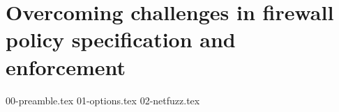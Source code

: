 \chapter{Overcoming challenges in firewall policy specification and enforcement}
\label{extend:chapter}

{00-preamble.tex}
{01-options.tex}
{02-netfuzz.tex}

